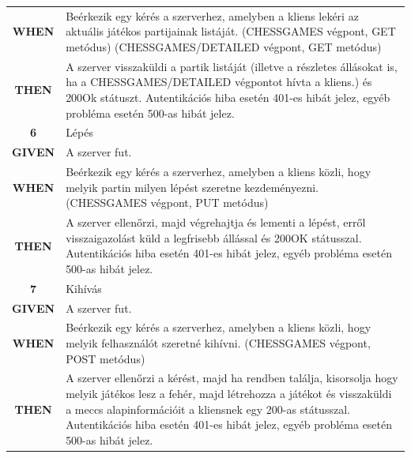 \documentclass[twoside, a4paper, 12pt]{article}
\begin{document}
\begin{longtable}[c]{|c|p{14cm}|}
	\textbf{WHEN} &
	Beérkezik egy kérés a szerverhez, amelyben a kliens lekéri az aktuális játékos partijainak listáját.
	(CHESSGAMES végpont, GET metódus)
	(CHESSGAMES/DETAILED végpont, GET metódus)
	\\
	\nobreakhline
	
	\textbf{THEN} &
	A szerver visszaküldi a partik listáját (illetve a részletes állásokat is, ha a CHESSGAMES/DETAILED végpontot hívta a kliens.) és 200Ok státuszt.
	Autentikációs hiba esetén 401-es hibát jelez, egyéb probléma esetén 500-as hibát jelez.
	\\
	\hline
	
	\rowcolor[HTML]{CBCEFB} 
	\textbf{6}
	&	Lépés
	\\ \nobreakhline
	
	\textbf{GIVEN} &
	A szerver fut.
	\\ \nobreakhline
	
	\textbf{WHEN} &
	Beérkezik egy kérés a szerverhez, amelyben a kliens közli, hogy melyik partin milyen lépést szeretne kezdeményezni. (CHESSGAMES végpont, PUT metódus)
	\\
	\nobreakhline
	
	\textbf{THEN} &
	A szerver ellenőrzi, majd végrehajtja és lementi a lépést, erről visszaigazolást küld a legfrisebb állással és 200OK státusszal.
	Autentikációs hiba esetén 401-es hibát jelez, egyéb probléma esetén 500-as hibát jelez.
	\\
	\hline
	
	\rowcolor[HTML]{CBCEFB} 
	\textbf{7}
	&	Kihívás
	\\ \nobreakhline
	
	\textbf{GIVEN} &
	A szerver fut.
	\\ \nobreakhline
	
	\textbf{WHEN} &
	Beérkezik egy kérés a szerverhez, amelyben a kliens közli, hogy melyik felhasználót szeretné kihívni. (CHESSGAMES végpont, POST metódus)
	\\
	\nobreakhline
	
	\textbf{THEN} &
	A szerver ellenőrzi a kérést, majd ha rendben találja, kisorsolja hogy melyik játékos lesz a fehér, majd létrehozza a játékot és visszaküldi a meccs alapinformációit a kliensnek egy 200-as státusszal.
	Autentikációs hiba esetén 401-es hibát jelez, egyéb probléma esetén 500-as hibát jelez.
	\\
	\hline
	

\end{longtable}
\end{document}
